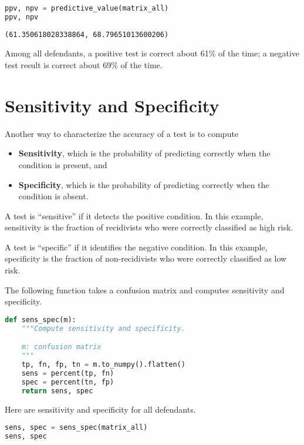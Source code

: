 \begin{lstlisting}[language=Python,style=source]
ppv, npv = predictive_value(matrix_all)
ppv, npv
\end{lstlisting}

\begin{lstlisting}[style=output]
(61.350618028338864, 68.79651013600206)
\end{lstlisting}

Among all defendants, a positive test is correct about 61\% of the time;
a negative test result is correct about 69\% of the time.

\section{Sensitivity and Specificity}\label{sensitivity-and-specificity}

Another way to characterize the accuracy of a test is to compute

\begin{itemize}
\item
  \textbf{Sensitivity}, which is the probability of predicting correctly
  when the condition is present, and
\item
  \textbf{Specificity}, which is the probability of predicting correctly
  when the condition is absent.
\end{itemize}

A test is ``sensitive'' if it detects the positive condition. In this
example, sensitivity is the fraction of recidivists who were correctly
classified as high risk.

A test is ``specific'' if it identifies the negative condition. In this
example, specificity is the fraction of non-recidivists who were
correctly classified as low risk.

The following function takes a confusion matrix and computes sensitivity
and specificity.

\begin{lstlisting}[language=Python,style=source]
def sens_spec(m):
    """Compute sensitivity and specificity.

    m: confusion matrix
    """
    tp, fn, fp, tn = m.to_numpy().flatten()
    sens = percent(tp, fn)
    spec = percent(tn, fp)
    return sens, spec
\end{lstlisting}

Here are sensitivity and specificity for all defendants.

\begin{lstlisting}[language=Python,style=source]
sens, spec = sens_spec(matrix_all)
sens, spec
\end{lstlisting}

